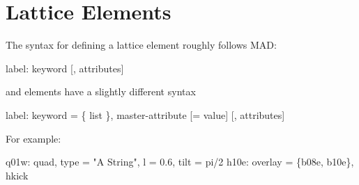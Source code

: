 \section{Lattice Elements}

The syntax for defining a lattice element roughly follows MAD:
\begin{example}
  label: keyword [, attributes]
\end{example}
 and  elements have a slightly different syntax
\begin{example}
  label: keyword = \{ list \}, master-attribute [= value] [, attributes]
\end{example}
For example:
\begin{example}
  q01w: quad, type = "A String", l = 0.6, tilt = pi/2
  h10e: overlay = \{b08e, b10e\}, hkick
\end{example}
